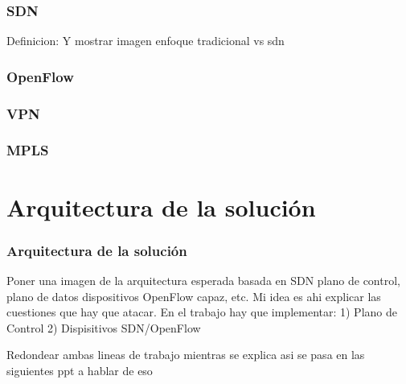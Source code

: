 \documentclass{beamer}
\begin{document}
\begin{frame}
\frametitle{SDN} 
Definicion:
Y mostrar imagen enfoque tradicional vs sdn

\end{frame}


%
%
%
%
%
%
%
%
%
%
%
%
%
%
%
%
%



\begin{frame}
\frametitle{OpenFlow} 

\end{frame}

\begin{frame}
\frametitle{VPN} 

\end{frame}

\begin{frame}
\frametitle{MPLS} 

\end{frame}

\section{Arquitectura de la soluci\'on} 

\begin{frame}
\frametitle{Arquitectura de la soluci\'on} 

Poner una imagen de la arquitectura esperada basada en SDN
plano de control, plano de datos dispositivos OpenFlow capaz, etc. Mi idea es ahi explicar
las cuestiones que hay que atacar. En el trabajo hay que implementar:
1) Plano de Control
2) Dispisitivos SDN/OpenFlow

Redondear ambas lineas de trabajo mientras se explica asi se pasa en las siguientes ppt a hablar de eso

\end{frame}
\end{document}
